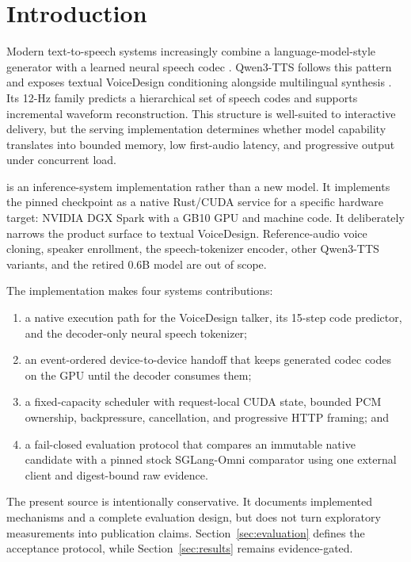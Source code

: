 \section{Introduction}

Modern text-to-speech systems increasingly combine a language-model-style
generator \cite{wang2023valle} with a learned neural speech codec
\cite{zeghidour2021soundstream,defossez2022encodec}. Qwen3-TTS follows this pattern
and exposes textual VoiceDesign conditioning alongside multilingual synthesis
\cite{hu2026qwen3tts}. Its 12-Hz family predicts a hierarchical set of speech
codes and supports incremental waveform reconstruction. This structure is
well-suited to interactive delivery, but the serving implementation determines
whether model capability translates into bounded memory, low first-audio
latency, and progressive output under concurrent load.

\projectname{} is an inference-system implementation rather than a new model.
It implements the pinned \modelname{} checkpoint as a native Rust/CUDA service
for a specific hardware target: NVIDIA DGX Spark with a GB10 GPU and
 machine code. It deliberately narrows the product surface to
textual VoiceDesign. Reference-audio voice cloning, speaker enrollment, the
speech-tokenizer encoder, other Qwen3-TTS variants, and the retired 0.6B model
are out of scope.

The implementation makes four systems contributions:

\begin{enumerate}
  \item a native execution path for the VoiceDesign talker, its 15-step code
        predictor, and the decoder-only neural speech tokenizer;
  \item an event-ordered device-to-device handoff that keeps generated codec
        codes on the GPU until the decoder consumes them;
  \item a fixed-capacity scheduler with request-local CUDA state, bounded PCM
        ownership, backpressure, cancellation, and progressive HTTP framing;
        and
  \item a fail-closed evaluation protocol that compares an immutable native
        candidate with a pinned stock SGLang-Omni comparator using one external
        client and digest-bound raw evidence.
\end{enumerate}

The present source is intentionally conservative. It documents implemented
mechanisms and a complete evaluation design, but does not turn exploratory
measurements into publication claims. Section~\ref{sec:evaluation} defines the
acceptance protocol, while Section~\ref{sec:results} remains evidence-gated.
